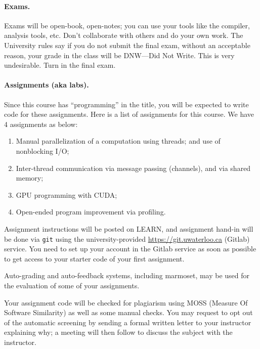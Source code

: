 \documentclass[letterpaper,10pt]{article}
\begin{document}
\paragraph{Exams.} Exams will be open-book, open-notes; you can use your tools like the compiler, analysis tools, etc. Don't collaborate with others and do your own work. The University rules say if you do not submit the final exam, without an acceptable reason, your grade in the class will be DNW---Did Not Write. This is very undesirable. Turn in the final exam.



\paragraph{Assignments (aka labs).} Since this course has ``programming'' in the 
title, you will be expected to write code for these assignments.  Here
is a list of assignments for this course. We have 4
assignments as below:

\begin{enumerate}
\item Manual parallelization of a computation using threads; and use of nonblocking I/O;
\item Inter-thread communication via message passing (channels), and via shared memory;
\item GPU programming with CUDA;
\item Open-ended program improvement via profiling.
\end{enumerate}
Assignment instructions will be posted on LEARN, and assignment hand-in will be done via \texttt{git} using the university-provided \url{https://git.uwaterloo.ca} (Gitlab) service. You need to set up your account in the Gitlab service as soon as possible to get access to your starter code of your first assignment.

Auto-grading and auto-feedback systems, including marmoset, may be used for the evaluation of some of your assignments.

Your assignment code will be checked for plagiarism using MOSS (Measure Of Software Similarity) as well as some manual checks. You may request to opt out of the automatic screening by sending a formal written letter to your instructor explaining why; a meeting will then follow to discuss the subject with the instructor. 
\end{document}
